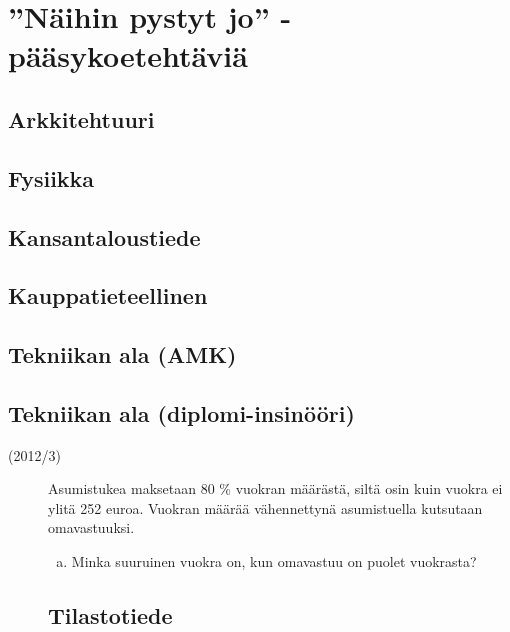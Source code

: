 \chapter{''Näihin pystyt jo'' -pääsykoetehtäviä}

\section{Arkkitehtuuri}

\section{Fysiikka}

\section{Kansantaloustiede}

\section{Kauppatieteellinen}

\section{Tekniikan ala (AMK)}

\section{Tekniikan ala (diplomi-insinööri)}
\begin{description}
	\item[(2012/3)] Asumistukea maksetaan 80 \% vuokran määrästä, siltä osin kuin vuokra ei ylitä 252 euroa. Vuokran määrää vähennettynä asumistuella kutsutaan omavastuuksi.
\begin{enumerate}[(a)]
	\item Minka suuruinen vuokra on, kun omavastuu on puolet vuokrasta?
\end{enumerate}

\section{Tilastotiede}

\end{description}
